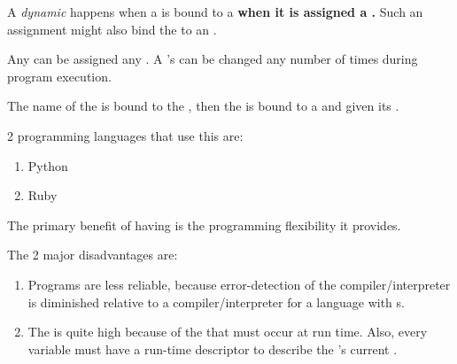 \begin{definition}[Dynamic]\label{def:Dynamic_Variable_Type_Binding}
  A \emph{dynamic}  happens when a  is bound to a  \textbf{when it is assigned a .}
  Such an assignment might also bind the  to an .

  Any  can be assigned any .
  A 's  can be changed any number of times during program execution.

  The name of the  is bound to the , then the  is bound to a  and given its .

  2 programming languages that use this are:
  \begin{enumerate}[noitemsep]
  \item Python
  \item Ruby
  \end{enumerate}

  \begin{remark}\label{rmk:Dynamic_Variable_Type_Bindign-Benefits}
    The primary benefit of having   is the programming flexibility it provides.
  \end{remark}

  \begin{remark}\label{rmk:Dynamic_Variable_Type_Binding-Drawbacks}
    The 2 major disadvantages are:
    \begin{enumerate}[noitemsep]
    \item Programs are less reliable, because error-detection of the compiler/interpreter is diminished relative to a compiler/interpreter for a language with   s.
    \item The  is quite high because of the  that must occur at run time. Also, every variable must have a run-time descriptor to describe the 's current .
    \end{enumerate}
  \end{remark}
\end{definition}

